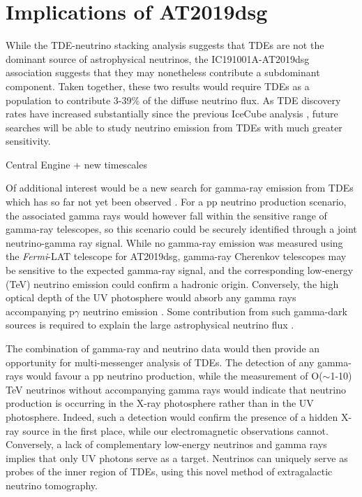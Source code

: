 \section{Implications of AT2019dsg}

While the TDE-neutrino stacking analysis suggests that TDEs are not the dominant source of astrophysical neutrinos, the IC191001A-AT2019dsg association suggests that they may nonetheless contribute a subdominant component. Taken together, these two results would require TDEs as a population to contribute 3-39\% of the diffuse neutrino flux. As TDE discovery rates have increased substantially since the previous IceCube analysis , future searches will be able to study neutrino emission from TDEs with much greater sensitivity.

 Central Engine + new timescales

Of additional interest would be a new search for gamma-ray emission from TDEs which has so far not yet been observed . For a pp neutrino production scenario, the associated gamma rays would however fall within the sensitive range of gamma-ray telescopes, so this scenario could be securely identified through a joint neutrino-gamma ray signal. While no gamma-ray emission was measured using the \textit{Fermi}-LAT telescope for AT2019dsg, gamma-ray Cherenkov telescopes may be sensitive to the expected gamma-ray signal, and the corresponding low-energy (TeV) neutrino emission could confirm a hadronic origin. Conversely, the high optical depth of the UV photosphere would absorb any gamma rays accompanying p$\gamma$ neutrino emission . Some contribution from such gamma-dark sources is required to explain the large astrophysical neutrino flux .

The combination of gamma-ray and neutrino data would then provide an opportunity for multi-messenger analysis of TDEs. The detection of any gamma-rays would favour a pp neutrino production, while the measurement of O($\sim$1-10) TeV neutrinos without accompanying gamma rays would indicate that neutrino production is occurring in the X-ray photosphere rather than in the UV photosphere. Indeed, such a detection would confirm the presence of a hidden X-ray source in the first place, while our electromagnetic observations cannot. Conversely, a lack of complementary low-energy neutrinos and gamma rays implies that only UV photons serve as a target. Neutrinos can uniquely serve as probes of the inner region of TDEs, using this novel method of extragalactic neutrino tomography. 